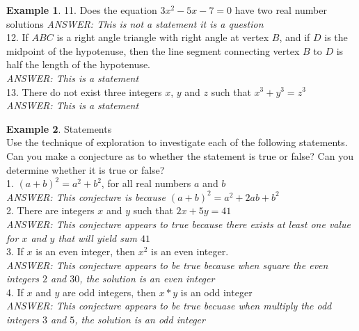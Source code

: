 \documentclass{book}
\theoremstyle{definition}
\newtheorem{example}{Example}[definition]
\theoremstyle{remark}
\begin{document}
\begin{example}
11. Does the equation $3x^2 - 5x -7 = 0$ have two real number solutions 
{\it ANSWER: This is not a statement it is a question} \\

12. If $ABC$ is a right angle triangle with right angle at vertex $B$, and if $D$ is the midpoint of the hypotenuse, then the line segment connecting vertex $B$ to $D$ is half the length of the hypotenuse. \\
{\it ANSWER: This is a statement} \\

13. There do not exist three integers $x$, $y$ and $z$ such that $x^3 + y^3 = z^3$ \\
{\it ANSWER: This is a statement} \\
\end{example}


\begin{example}
Statements \cite[Chap.1, P.C.1.2, Q.1-4]{ted} \\

Use the technique of exploration to investigate each of the following statements.
Can you make a conjecture as to whether the statement is true or false? Can you determine whether it is true or false? \\


1. $(a+b)^2 = a^2 + b^2$, for all real numbers $a$ and $b$ \\
{\it ANSWER: This conjecture is because $(a+b)^2 = a^2 + 2ab + b^2$} \\

2. There are integers $x$ and $y$ such that $2x + 5y = 41$ \\
{\it ANSWER: This conjecture appears to true because there exists at least one value for $x$ and $y$ that will yield sum $41$} \\

3. If $x$ is an even integer, then $x^2$ is an even integer. \\
{\it ANSWER: This conjecture appears to be true because when square the even integers $2$ and $30$, the solution is an even integer} \\

4. If $x$ and $y$ are odd integers, then $x*y$ is an odd integer \\
{\it ANSWER: This conjecture appears to be true becuase when multiply the odd integers $3$ and $5$, the solution is an odd integer} \\
\end{example}
\end{document}
